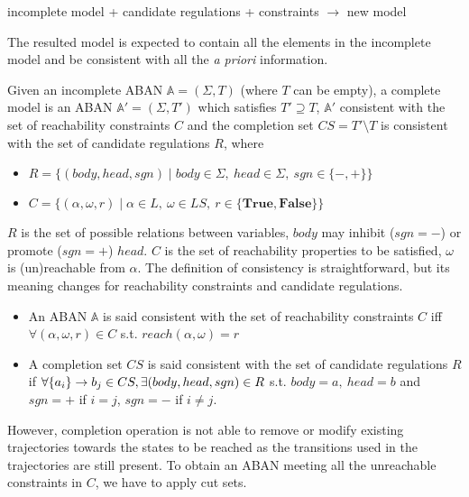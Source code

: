 incomplete model + candidate regulations + constraints $\to$ new model

The resulted model is expected to contain all the elements in the incomplete model and be consistent with all the \textit{a priori} information. 

\begin{definition}
    Given an incomplete ABAN $\mathbb{A}=(\Sigma,T)$ (where $T$ can be empty), a complete model is an ABAN $\mathbb{A}'=(\Sigma,T')$ which satisfies $T'\supseteq T$, $\mathbb{A}'$ consistent with the set of reachability constraints $C$ and the completion set $CS=T'\setminus T$ is consistent with the set of candidate regulations $R$, where
    \begin{itemize}
        \item $R=\{(body,head,sgn)\mid body\in \Sigma,\ head\in \Sigma,\ sgn\in \{-,+\}\}$ 
        \item $C=\{(\alpha,\omega,r)\mid\alpha \in L,\ \omega\in LS,\ r\in \{\mathbf{True,False}\}\}$
    \end{itemize}
\end{definition}

$R$ is the set of possible relations between variables, $body$ may inhibit ($sgn=-$) or promote ($sgn=+$) $head$.
$C$ is the set of reachability properties to be satisfied, $\omega$ is (un)reachable from $\alpha$.
The definition of consistency is straightforward, but its meaning changes for reachability constraints and candidate regulations.

\begin{definition}[Consistency]\label{def:consistencyFirst}
\leavevmode
\makeatletter
\@nobreaktrue
\makeatother
\begin{itemize}
    \item An ABAN $\mathbb{A}$ is said consistent with the set of reachability constraints $C$ iff $\forall (\alpha,\omega,r)\in C$ s.t. $reach(\alpha,\omega)=r$
    \item A completion set $CS$ is said consistent with the set of candidate regulations $R$ if $\forall \acm{a_i}{b_{1-j}}{b_j}\in CS, \exists (body,head,sgn)\in R$ s.t. $body=a,\ head=b$ and $sgn=+$ if $i=j$, $sgn=-$ if $i\neq j$. 
\end{itemize}
    
\end{definition}

However, completion operation is not able to remove or modify existing trajectories towards the states to be reached as the transitions used in the trajectories are still present.
To obtain an ABAN meeting all the unreachable constraints in $C$, we have to apply cut sets.

